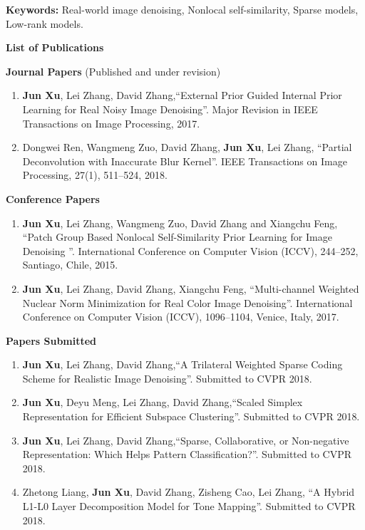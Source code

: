 \documentclass[12pt,oneside]{report}
\numberwithin{figure}{chapter}
\newenvironment{preliminary}%
{\pagestyle{plain}\pagenumbering{roman}}%
{\pagenumbering{arabic}}
\begin{document}
\begin{preliminary}
\textbf{Keywords:} Real-world image denoising, Nonlocal self-similarity, Sparse models, Low-rank models.

\newpage
{}
\Large\begin{center}\textbf{List of Publications}\end{center}\normalsize

\textbf{Journal Papers} (Published and under revision)
\begin{enumerate}
 \item \textbf{Jun Xu}, Lei Zhang, David Zhang,``External Prior Guided Internal Prior Learning for Real Noisy Image Denoising''. Major Revision in IEEE Transactions on Image Processing, 2017.
\vspace{-2mm}
  \item Dongwei Ren, Wangmeng Zuo, David Zhang, \textbf{Jun Xu}, Lei Zhang, ``Partial Deconvolution with Inaccurate Blur Kernel''. IEEE Transactions on Image Processing, 27(1), 511--524, 2018. 

\end{enumerate}

\textbf{Conference Papers}
\begin{enumerate}
  \item \textbf{Jun Xu}, Lei Zhang, Wangmeng Zuo, David Zhang and Xiangchu Feng, ``Patch Group Based Nonlocal Self-Similarity Prior Learning for Image Denoising ''. International Conference on Computer Vision (ICCV), 244--252, Santiago, Chile, 2015.
\vspace{-2mm}
  \item \textbf{Jun Xu}, Lei Zhang, David Zhang, Xiangchu Feng, ``Multi-channel Weighted Nuclear Norm Minimization for Real Color Image Denoising''. International Conference on Computer Vision (ICCV), 1096--1104, Venice, Italy, 2017.
\end{enumerate}

\textbf{Papers Submitted}
\begin{enumerate}
 \item \textbf{Jun Xu}, Lei Zhang, David Zhang,``A Trilateral Weighted Sparse Coding Scheme for Realistic Image Denoising''. Submitted to CVPR 2018.
\vspace{-2mm}
 \item \textbf{Jun Xu}, Deyu Meng, Lei Zhang, David Zhang,``Scaled Simplex Representation for Efficient Subspace Clustering''. Submitted to CVPR 2018.
\vspace{-2mm}
 \item \textbf{Jun Xu}, Lei Zhang, David Zhang,``Sparse, Collaborative, or Non-negative Representation: Which Helps Pattern Classification?''. Submitted to CVPR 2018.
\vspace{-2mm}
 \item Zhetong Liang, \textbf{Jun Xu}, David Zhang, Zisheng Cao, Lei Zhang, ``A Hybrid L1-L0 Layer Decomposition Model for Tone Mapping''. Submitted to CVPR 2018.
\end{enumerate}


\end{preliminary}
\end{document}
